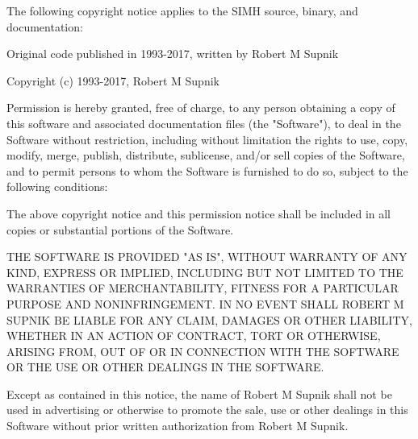 The following copyright notice applies to the SIMH source, binary, and documentation:
\begin{adjustwidth}{5ex}{1ex}
Original code published in 1993-2017, written by Robert M Supnik

Copyright (c) 1993-2017, Robert M Supnik

Permission is hereby granted, free of charge, to any person obtaining a copy of this
software and associated documentation files (the "Software"), to deal in the Software
without restriction, including without limitation the rights to use, copy, modify, merge,
publish, distribute, sublicense, and/or sell copies of the Software, and to permit persons
to whom the Software is furnished to do so, subject to the following conditions:

The above copyright notice and this permission notice shall be included in all copies or
substantial portions of the Software.

THE SOFTWARE IS PROVIDED "AS IS", WITHOUT WARRANTY OF ANY KIND,
EXPRESS OR IMPLIED, INCLUDING BUT NOT LIMITED TO THE WARRANTIES OF
MERCHANTABILITY, FITNESS FOR A PARTICULAR PURPOSE AND
NONINFRINGEMENT. IN NO EVENT SHALL ROBERT M SUPNIK BE LIABLE FOR
ANY CLAIM, DAMAGES OR OTHER LIABILITY, WHETHER IN AN ACTION OF
CONTRACT, TORT OR OTHERWISE, ARISING FROM, OUT OF OR IN
CONNECTION WITH THE SOFTWARE OR THE USE OR OTHER DEALINGS IN THE
SOFTWARE.

Except as contained in this notice, the name of Robert M Supnik shall not be used in
advertising or otherwise to promote the sale, use or other dealings in this Software
without prior written authorization from Robert M Supnik.
\end{adjustwidth}
